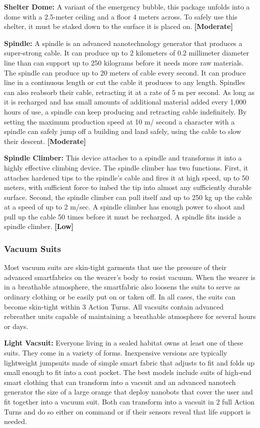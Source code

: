 \textbf{Shelter Dome:} A variant of the emergency bubble, 
this package unfolds into a dome with a 2.5-meter 
ceiling and a floor 4 meters across. To safely use this 
shelter, it must be staked down to the surface it is 
placed on. \textbf{[Moderate]}

\textbf{Spindle: }A spindle is an advanced nanotechnology 
generator that produces a super-strong cable. It can 
produce up to 2 kilometers of 0.2 millimeter diameter 
line than can support up to 250 kilograms before it 
needs more raw materials. The spindle can produce 
up to 20 meters of cable every second. It can produce 
line in a continuous length or cut the cable it produces 
to any length. Spindles can also reabsorb their cable, 
retracting it at a rate of 5 m per second. As long as 
it is recharged and has small amounts of additional 
material added every 1,000 hours of use, a spindle 
can keep producing and retracting cable indefinitely. 
By setting the maximum production speed at 10 m/
second a character with a spindle can safely jump 
off a building and land safely, using the cable to slow 
their descent. \textbf{[Moderate]}

\textbf{Spindle Climber:} This device attaches to a spindle 
and transforms it into a highly effective climbing 
device. The spindle climber has two functions. First, it 
attaches hardened tips to the spindle's cable and fires 
it at high speed, up to 50 meters, with sufficient force 
to imbed the tip into almost any sufficiently durable 
surface. Second, the spindle climber can pull itself and 
up to 250 kg up the cable at a speed of up to 2 m/sec. 
A spindle climber has enough power to shoot and pull 
up the cable 50 times before it must be recharged. A 
spindle fits inside a spindle climber. \textbf{[Low]}

\subsubsection{Vacuum Suits}

Most vacuum suits are skin-tight garments that use 
the pressure of their advanced smartfabrics on the 
wearer's body to resist vacuum. When the wearer is in 
a breathable atmosphere, the smartfabric also loosens 
the suits to serve as ordinary clothing or be easily 
put on or taken off. In all cases, the suits can become 
skin-tight within 3 Action Turns. All vacsuits contain 
advanced rebreather units capable of maintaining a 
breathable atmosphere for several hours or days.

\textbf{Light Vacsuit:} Everyone living in a sealed habitat 
owns at least one of these suits. They come in a variety
of forms. Inexpensive versions are typically lightweight
jumpsuits made of simple smart fabric that
adjusts to fit and folds up small enough to fit into a 
coat pocket. The best models include suits of high-end 
smart clothing that can transform into a vacsuit and 
an advanced nanotech generator the size of a large 
orange that deploy nanobots that cover the user and 
fit together into a vacuum suit. Both can transform 
into a vacsuit in 2 full Action Turns and do so either 
on command or if their sensors reveal that life support
is needed.


